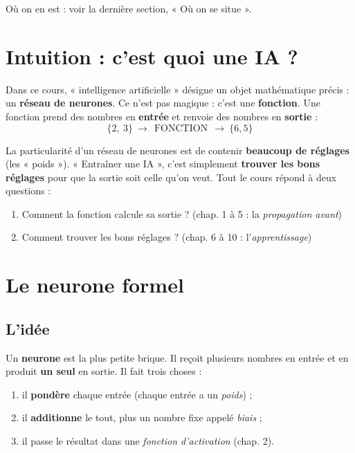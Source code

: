 \documentclass[11pt]{article}
\begin{document}
\begin{center}
\small Où on en est : voir la dernière section, « Où on se situe ».
\end{center}

\section{Intuition : c'est quoi une IA ?}

Dans ce cours, « intelligence artificielle » désigne un objet mathématique
précis : un \textbf{réseau de neurones}. Ce n'est pas magique : c'est une
\textbf{fonction}. Une fonction prend des nombres en \textbf{entrée} et renvoie
des nombres en \textbf{sortie} :
\[
\{2,\ 3\}\ \longrightarrow\ \boxed{\ \text{FONCTION}\ }\ \longrightarrow\ \{6{,}5\}
\]

La particularité d'un réseau de neurones est de contenir \textbf{beaucoup de
réglages} (les « poids »). « Entraîner une IA », c'est simplement \textbf{trouver
les bons réglages} pour que la sortie soit celle qu'on veut. Tout le cours répond
à deux questions :

\begin{enumerate}[leftmargin=2em]
  \item Comment la fonction calcule sa sortie ? (chap. 1 à 5 : la \emph{propagation avant})
  \item Comment trouver les bons réglages ? (chap. 6 à 10 : l'\emph{apprentissage})
\end{enumerate}

\section{Le neurone formel}

\subsection{L'idée}
Un \textbf{neurone} est la plus petite brique. Il reçoit plusieurs nombres en
entrée et en produit \textbf{un seul} en sortie. Il fait trois choses :
\begin{enumerate}[leftmargin=2em]
  \item il \textbf{pondère} chaque entrée (chaque entrée a un \emph{poids}) ;
  \item il \textbf{additionne} le tout, plus un nombre fixe appelé \emph{biais} ;
  \item il passe le résultat dans une \emph{fonction d'activation} (chap. 2).
\end{enumerate}
\end{document}
